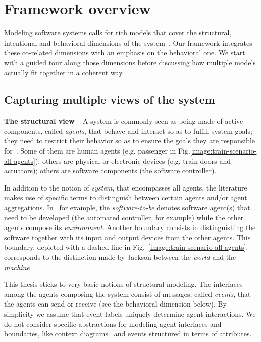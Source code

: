 \section{Framework overview\label{section:background-multi-agent-systems-and-behavior-modeling}}

Modeling software systems calls for rich models that cover the structural, intentional and behavioral dimensions of the system~\cite{VanLamsweerde:2000}. Our framework integrates these co-related dimensions with an emphasis on the behavioral one. We start with a guided tour along those dimensions before discussing how multiple models actually fit together in a coherent way.

\subsection{Capturing multiple views of the system\label{subsection:background-multiple-views}}


\noindent \textbf{The structural view} -- A system is commonly seen as being made of active components, called \emph{agents}, that behave and interact so as to fulfill system goals; they need to restrict their behavior so as to ensure the goals they are responsible for~\cite{Feather:1987}. Some of them are human agents (e.g. passenger in Fig.\ref{image:train-scenario-all-agents}); others are physical or electronic devices (e.g. train doors and actuators); others are software components (the software controller).

In addition to the notion of \emph{system}, that encompasses all agents, the literature makes use of specific terms to distinguish between certain agents and/or agent aggregations. In~\cite{VanLamsweerde:2009} for example, the \emph{software-to-be} denotes software agent(s) that need to be developed (the automated controller, for example) while the other agents compose its \emph{environment}. Another boundary consists in distinguishing the software together with its input and output devices from the other agents. This boundary, depicted with a dashed line in Fig.~\ref{image:train-scenario-all-agents}, corresponds to the distinction made by Jackson between the \emph{world} and the \emph{machine}~\cite{Jackson:1995}.

This thesis sticks to very basic notions of structural modeling. The interfaces among the agents composing the system consist of messages, called \emph{events}, that the agents can send or receive (see the behavioral dimension below). By simplicity we assume that event labels uniquely determine agent interactions. We do not consider specific abstractions for modeling agent interfaces and boundaries, like context diagrams~\cite{Jackson:1995} and events structured in terms of attributes.

